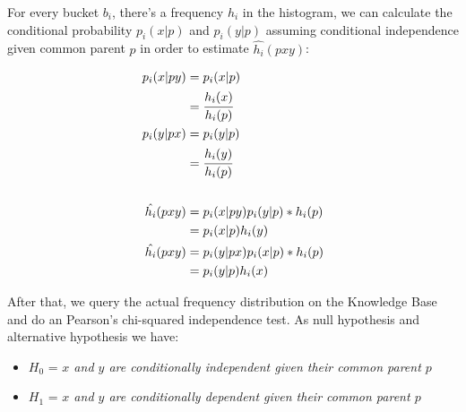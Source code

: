 \begin{center}
\end{center}



For every bucket $b_i$, there's a frequency $h_i$ in the histogram, we can calculate the conditional probability $p_i(x|p)$ and $p_i(y|p)$ assuming conditional independence given common parent $p$ in order to estimate $\hat{h_i}(p x y)$:

\begin{equation}
\begin{split}
 p_i(x|py) &= p_i(x|p) \\ 
 &= \cfrac{h_i(x)}{h_i(p)} \\ 
 p_i(y|px) &= p_i(y|p) \\ 
 &= \cfrac{h_i(y)}{h_i(p)} \\ \\ 
 \hat{h_i}(pxy) &= p_i(x|py)p_i(y|p)*h_i(p) \\ 
 &= p_i(x|p)h_i(y) \\ 
 \hat{h_i}(pxy) &= p_i(y|px)p_i(x|p)*h_i(p) \\ 
 &= p_i(y|p)h_i(x) 
\end{split}
\end{equation}

After that, we query the actual frequency distribution on the Knowledge Base and do an Pearson's chi-squared independence test. As null hypothesis and alternative hypothesis we have:

\begin{itemize}
 \item $H_0$ = \emph{$x$ and $y$ are conditionally independent given their common parent $p$}
 \item $H_1$ = \emph{$x$ and $y$ are conditionally dependent given their common parent $p$} 
\end{itemize}

